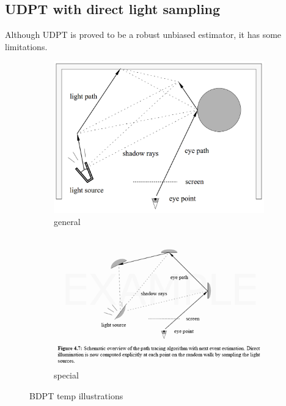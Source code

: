 \subsection{UDPT with direct light sampling}
Although \gls{UDPT} is proved to be a robust unbiased estimator, it has some
limitations.
\begin{figure}
    \centering
    \begin{subfigure}{0.45\textwidth}
        \includegraphics[width=\textwidth]{imgs/schemes/generalized_BDPT_lafortune}
        \caption{general}
        \label{fig:bdptgeneral}
    \end{subfigure}
    \quad
    \begin{subfigure}{0.45\textwidth}
        \includegraphics[width=\textwidth]{imgs/schemes/PT2_resize}
        \caption{special}
        \label{fig:udpt_ptdl}
    \end{subfigure}

    \caption{BDPT temp illustrations}
    \label{fig:bdpt}
\end{figure}


